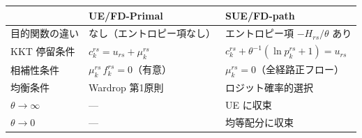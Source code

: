 \begin{center}
\small
\begin{tabular}{l p{} p{}}
  \toprule
  & UE/FD-Primal & SUE/FD-path \\
  \midrule
  目的関数の違い & なし（エントロピー項なし）& エントロピー項 $-H_{rs}/\theta$ あり \\[2pt]
  KKT 停留条件 & $c_k^{rs} = u_{rs} + \mu_k^{rs}$ & $c_k^{rs} + \theta^{-1}(\ln p_k^{rs}+1) = u_{rs}$ \\[2pt]
  相補性条件 & $\mu_k^{rs}\,f_k^{rs} = 0$（有意） & $\mu_k^{rs} = 0$（全経路正フロー） \\[2pt]
  均衡条件 & Wardrop 第1原則 & ロジット確率的選択 \\[2pt]
  $\theta \to \infty$ & — & UE に収束 \\[2pt]
  $\theta \to 0$ & — & 均等配分に収束 \\
  \bottomrule
\end{tabular}
\end{center}
